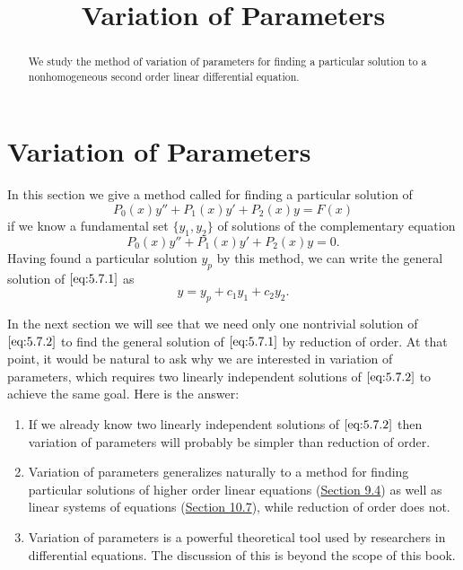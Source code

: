 \documentclass{ximera}
\title{Variation of Parameters}
\begin{document}
 
\begin{abstract}
 We study the method of variation of parameters for finding a particular solution to a nonhomogeneous second order linear differential equation.
\end{abstract}
 
\maketitle
 
\section*{Variation of Parameters}
 
In this section we give a method called  for finding a particular solution of
\begin{equation} \label{eq:5.7.1}
P_0(x)y''+P_1(x)y'+P_2(x)y=F(x)
\end{equation}
if we know a fundamental set $\{y_1,y_2\}$ of solutions of the
complementary equation
\begin{equation} \label{eq:5.7.2}
P_0(x)y''+P_1(x)y'+P_2(x)y=0.
\end{equation}
Having found a particular solution $y_p$ by this method, we can write
the general solution of $\eqref{eq:5.7.1}$ as
$$
y=y_p+c_1y_1+c_2y_2.
$$
 
In the next section we will see that we need only one nontrivial solution of $\eqref{eq:5.7.2}$ to find the general solution of $\eqref{eq:5.7.1}$ by reduction of order.  At that point, it would be natural to ask why we are interested in variation of parameters, which requires
two linearly independent solutions of $\eqref{eq:5.7.2}$ to achieve the same
goal. Here is the answer:
 
\begin{enumerate}
\item If we already know two linearly independent solutions of
$\eqref{eq:5.7.2}$ then variation of parameters will probably be simpler than reduction of order.
 
\item Variation of parameters generalizes naturally to a method
for finding particular solutions of higher order linear equations (\href{https://xerxes.ximera.org/differentialequations/main/varParHigherOrder/varParHigherOrder}{Section 9.4}) as well as linear systems of
equations
(\href{https://xerxes.ximera.org/differentialequations/main/varParamNonHomLinSys/varParamNonHomLinSys}{Section 10.7}), while reduction of order does not.
 
\item Variation of parameters is a powerful theoretical tool
 used by researchers in differential equations. The discussion of this is beyond the scope of this book.
  
 \end{enumerate}
 
\end{document}
